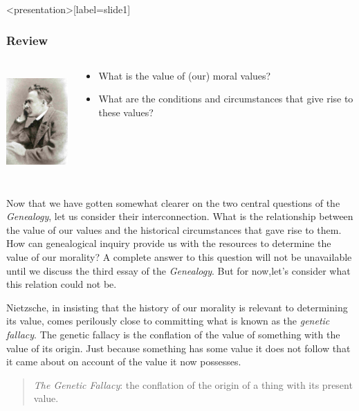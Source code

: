 \begin{frame}<presentation>[label=slide1]
    \frametitle{Review}
        \begin{columns}
            \begin{column}{3cm}
                \includegraphics[height=4cm]{../../../graphics/nietzsche.jpg}
            \end{column}
            \begin{column}{7cm}
                \begin{itemize}
                    \item What is the value of (our) moral values?
                    \item What are the conditions and circumstances that give rise to these values?
                \end{itemize}
            \end{column}
        \end{columns}
\end{frame}

Now that we have gotten somewhat clearer on the two central questions of the \emph{Genealogy}, let us consider their interconnection. What is the relationship between the value of our values and the historical circumstances that gave rise to them. How can genealogical inquiry provide us with the resources to determine the value of our morality? A complete answer to this question will not be unavailable until we discuss the third essay of the \emph{Genealogy}. But for now,let's consider what this relation could not be.

Nietzsche, in insisting that the history of our morality is relevant to determining its value, comes perilously close to committing what is known as the \emph{genetic fallacy}. The genetic fallacy is the conflation of the value of something with the value of its origin. Just because something has some value it does not follow that it came about on account of the value it now possesses. 
\begin{quote}
    \emph{The Genetic Fallacy}: the conflation of the origin of a thing with its present value.
\end{quote}

